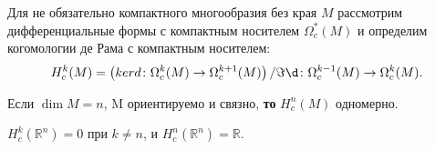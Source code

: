 \begin{to_tas}
	Для не обязательно компактного многообразия без края $M$ рассмотрим дифференциальные формы с компактным носителем $\Omega_c^*(M)$ и определим когомологии де Рама с компактным носителем:
	\begin{equation*}
		H_c^k (M) = \left(ker d \colon \Omega_c^k (M) \rightarrow \Omega^{k+1}_c (M)\right) / \Im \d \colon \Omega_c^{k-1}(M) \rightarrow \Omega_c^{k}(M).
	\end{equation*}

	Если $ \dim M = n$, M ориентируемо и связно, \textbf{то} $H_c^n(M)$ одномерно.
\end{to_tas}

\begin{to_tas}
	$H_c^k (\mathbb{R}^n) = 0$ при $k \neq n$, и $H_c^n(\mathbb{R}^n) = \mathbb{R} $.
\end{to_tas}